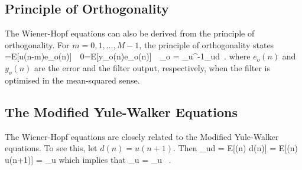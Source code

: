 \subsection{Principle of Orthogonality}
The Wiener-Hopf equations can also be derived from the principle of orthogonality. For $m=0,1,\ldots,M-1$, the principle of orthogonality states
=E[u(n-m)e_o(n)]\ \iff\ 0=E[y_o(n)e_o(n)]\ \iff\ _o = _u^{-1}_{ud}\ .
\emath
where $e_o(n)$ and $y_o(n)$ are the error and the filter output, respectively, when the filter is optimised in the mean-squared sense.

\subsection{The Modified Yule-Walker Equations}
The Wiener-Hopf equations are closely related to the Modified Yule-Walker equations. To see this, let $d(n)=u(n+1)$. Then
\bmath
  _{ud} = E[(n) d(n)] = E[(n) u(n+1)] = _u
\emath
which implies that
\bmath
  _u = _u \qquad {}\ .
\emath

